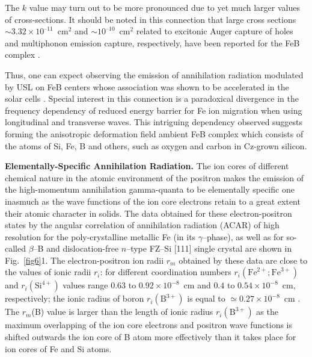 \documentclass{ttp}
\begin{document}
The $k$ value may turn out to be more pronounced due to yet much larger values of cross-sections. 
It should be noted in this connection that large cross sections $\sim\!3.32\times10^{–11}$~cm$^2$  
and $\sim\!10^{–10}$~cm$^2$  related to excitonic Auger capture of holes and multiphonon emission capture, 
respectively, have been reported for the FeB complex \cite{Paudyal2009,Istratov1999}. 

Thus, one can expect observing the emission of annihilation radiation modulated by USL on FeB centers 
whose association was shown to be accelerated in the solar cells \cite{Olikh2022:JMatSci}. 
Special interest in this connection is a paradoxical divergence in the frequency dependency of reduced 
energy barrier for Fe ion migration  when using longitudinal and transverse waves. 
This intriguing dependency observed suggests forming the anisotropic deformation field ambient FeB complex 
which consists of the atoms of Si, Fe, B and others, such as oxygen and carbon in Cz-grown silicon.


\noindent \textbf{Elementally-Specific Annihilation Radiation.}
The ion cores of different chemical nature in the atomic environment of the positron 
makes the emission of the high-momentum annihilation gamma-quanta to be elementally specific one inasmuch 
as the wave functions of the ion core electrons retain to a great extent their atomic character in solids.  
The data obtained for these electron-positron states by the angular correlation of annihilation radiation (ACAR) 
of high resolution for the poly-crystalline metallic Fe (in its $\gamma$--phase), 
as well as for so-called $\beta$--B and dislocation-free $n$–type FZ–Si [111] single crystal are shown in Fig.~\ref{fig6}1. 
The electron-positron ion radii $r_m$ obtained by these data are close to the values of ionic radii $r_i$: 
for different coordination numbers $r_i(\mathrm{Fe}^{2+}; \mathrm{Fe}^{3+})$ and $r_i(\mathrm{Si}^{4+})$ values 
range 0.63 to $0.92\times10^{−8}$~cm and $0.4$ to $0.54\times10^{−8}$~cm, respectively; 
the ionic radius of boron $r_i(\mathrm{B}^{3+})$ is equal to $\simeq0.27\times10^{−8}$~cm \cite{Suchet1965,Rahm2016}. 
The $r_m$(B) value is larger than the length of ionic radius $r_i(\mathrm{B}^{3+})$ as the maximum overlapping of the ion core
 electrons and positron wave functions \cite{Ferrell1956} is shifted outwards the ion core of B atom more effectively than it takes place for ion cores of Fe and Si atoms.


\end{document}
